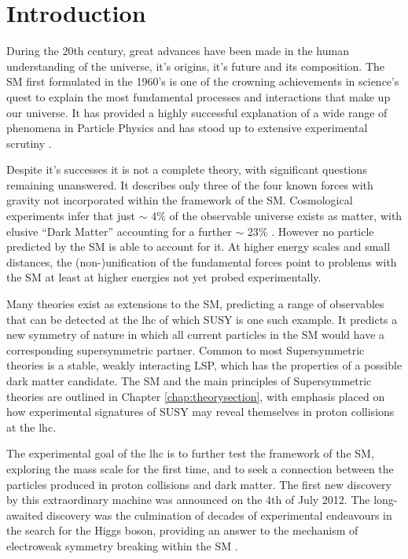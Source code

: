 \chapter{Introduction}
\label{chap:introduction}

During the 20th century, great advances have been made in the human understanding of the universe, it's origins, it's future and its composition. The \acf{SM} first formulated in the 1960's is one of the crowning achievements in science's quest to explain the most fundamental processes and interactions that make up our universe. It has provided a highly successful explanation of a wide range of phenomena in Particle Physics and has stood up to extensive experimental scrutiny \cite{pdg2012}.

Despite it's successes it is not  a complete theory, with significant questions remaining unanswered. It describes only three of the four known forces with gravity not incorporated within the framework of the \ac{SM}. Cosmological experiments infer that just $\sim$ 4$\%$ of the observable universe exists as matter, with elusive ``Dark Matter'' accounting for a further $\sim$ 23$\%$ \cite{0067-0049-208-2-19}. However no particle predicted by the \ac{SM} is able to account for it.  At higher energy scales and small distances, the (non-)unification of the fundamental forces point to problems with the \ac{SM} at least at higher energies not yet probed experimentally. 

Many theories exist as extensions to the \ac{SM}, predicting a range of observables that can be detected at the \acf{lhc} of which \acf{SUSY} is one such example. It predicts a new symmetry of nature in which all current particles in the \ac{SM} would have a corresponding supersymmetric partner. Common to most Supersymmetric theories is a stable, weakly interacting \acf{LSP}, which has the properties of a possible dark matter candidate. The \ac{SM} and the main principles of Supersymmetric theories are outlined in Chapter \ref{chap:theorysection}, with emphasis placed on how experimental signatures of \ac{SUSY} may reveal themselves in proton collisions at the \ac{lhc}.

The experimental goal of the \ac{lhc} is to further test the framework of the \ac{SM}, exploring the \TeV mass scale for the first time, and to seek a connection between the particles produced in proton collisions and dark matter. The first new discovery by this extraordinary machine was announced on the 4th of July 2012. The long-awaited discovery was the culmination of decades of experimental endeavours in the search for the Higgs boson, providing an answer to the mechanism of electroweak symmetry breaking within the \ac{SM} \cite{Aad:2012tfa}\cite{Chatrchyan:2012ufa}. 

